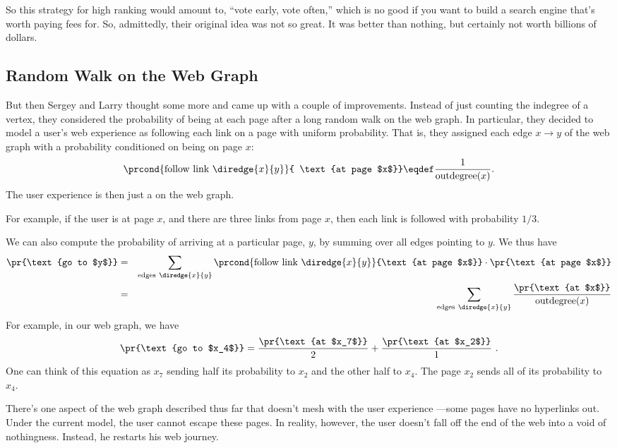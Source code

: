 
So this strategy for high ranking would amount to, ``vote early, vote
often,'' which is no good if you want to build a search engine that's
worth paying fees for.  So, admittedly, their original idea was not so
great.  It was better than nothing, but certainly not worth billions of
dollars.

\subsection{Random Walk on the Web Graph}

But then Sergey and Larry thought some more and came up with a couple of
improvements.  Instead of just counting the indegree of a vertex, they
considered the probability of being at each page after a long random walk
on the web graph.  In particular, they decided to model a user's web
experience as following each link on a page with uniform probability.
That is, they assigned each edge $x \rightarrow y$ of the web graph with a
probability conditioned on being on page $x$:
\[
\prcond{\text{follow link}\ \diredge{x}{y}}{ \text{at page $x$}} \eqdef
\frac{1}{\text{outdegree}(x)}.
\]
The user experience is then just a  on the web graph.

For example, if the user is at page $x$, and there are three links from
page $x$, then each link is followed with probability $1/3$.

We can also compute the probability of arriving at a particular page, $y$,
by summing over all edges pointing to $y$.  We thus have
\begin{eqnarray}
  \pr{\text{go to $y$}} &=&  \sum_{\text{edges}\ \diredge{x}{y}}
  \prcond{\text{follow link}\ \diredge{x}{y}}{\text{at page $x$}} \cdot
  \pr{\text{at page $x$}} \nonumber\\
  &=& \sum_{\text{edges}\ \diredge{x}{y}} \frac{\pr{\text{at
      $x$}}}{\text{outdegree}(x)} \label{LN12:stepprob}
\end{eqnarray}
For example, in our web graph, we have
\[ \pr{\text{go to $x_4$}} = \frac{\pr{\text{at $x_7$}}}{2} +
\frac{\pr{\text{at $x_2$}}}{1} \ .
\]
One can think of this equation as $x_7$ sending half its probability to
$x_2$ and the other half to $x_4$. The page $x_2$ sends all of its
probability to $x_4$.

There's one aspect of the web graph described thus far that doesn't mesh
with the user experience ---some pages have no hyperlinks out.  Under the
current model, the user cannot escape these pages.  In reality, however,
the user doesn't fall off the end of the web into a void of nothingness.
Instead, he restarts his web journey.

